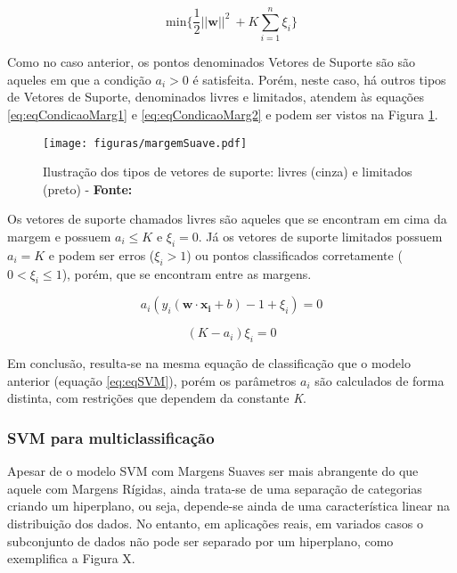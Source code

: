 \begin{equation}
\label{eq:eqMinErro}
  \text{min}\{\frac{1}{2}||\boldsymbol{w}||^2\ + K\displaystyle\sum_{i=1}^{n}\xi_i\}
\end{equation}

Como no caso anterior, os pontos denominados Vetores de Suporte são são aqueles em que a condição $a_i > 0$ é satisfeita. Porém, neste caso, há outros tipos de Vetores de Suporte, denominados livres e limitados, atendem às equações \ref{eq:eqCondicaoMarg1} e \ref{eq:eqCondicaoMarg2} e podem ser vistos na Figura \ref{fig:margemSuave}.

\begin{figure}[H]
 \centering
  \texttt{[image: figuras/margemSuave.pdf]}
  \caption{Ilustração dos tipos de vetores de suporte: livres (cinza) e limitados (preto) - \textbf{Fonte:} }
  \label{fig:margemSuave}
\end{figure}

Os vetores de suporte chamados livres são aqueles que se encontram em cima da margem e possuem $a_i \leq K$ e $\xi_i = 0$. Já os vetores de suporte limitados possuem $a_i = K$ e podem ser erros ($\xi_i > 1$) ou pontos classificados corretamente ($0 <\xi_i \leq 1$), porém, que se encontram entre as margens.

\begin{equation}
\label{eq:eqCondicaoMarg1}
 a_i(y_i(\boldsymbol{w} \cdot \boldsymbol{x_i} + b) - 1 + \xi_i) = 0
\end{equation}

\begin{equation}
\label{eq:eqCondicaoMarg2}
 (K - a_i)\xi_i = 0
\end{equation}

Em conclusão, resulta-se na mesma equação de classificação que o modelo anterior (equação \ref{eq:eqSVM}), porém os parâmetros $a_i$ são calculados de forma distinta, com restrições que dependem da constante \textit{K}.

\subsubsection{SVM para multiclassificação}

Apesar de o modelo SVM com Margens Suaves ser mais abrangente do que aquele com Margens Rígidas, ainda trata-se de uma separação de categorias criando um hiperplano, ou seja, depende-se ainda de uma característica linear na distribuição dos dados. No entanto, em aplicações reais, em variados casos o subconjunto de dados não pode ser separado por um hiperplano, como exemplifica a Figura X.

